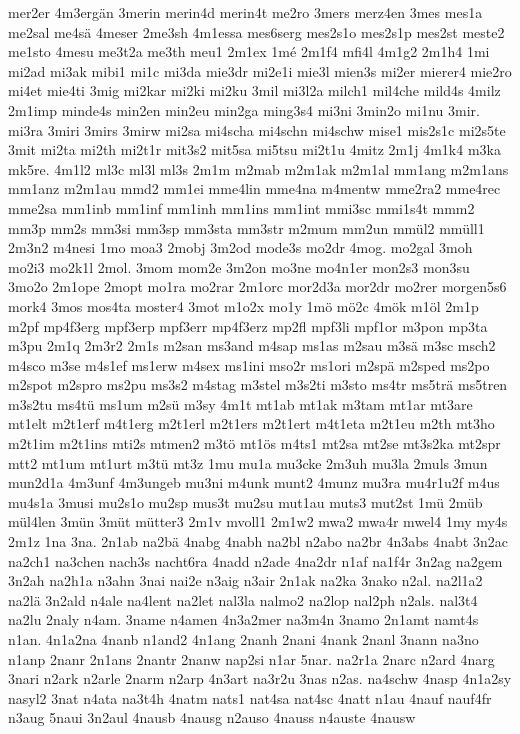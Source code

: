 {mer2er
4m3ergän
3merin
merin4d
merin4t
me2ro
3mers
merz4en
3mes
mes1a
me2sal
me4sä
4meser
2me3sh
4m1essa
mes6serg
mes2s1o
mes2s1p
mes2st
meste2
me1sto
4mesu
me3t2a
me3th
meu1
2m1ex
1mé
2m1f4
mfi4l
4m1g2
2m1h4
1mi
mi2ad
mi3ak
mibi1
mi1c
mi3da
mie3dr
mi2e1i
mie3l
mien3s
mi2er
mierer4
mie2ro
mi4et
mie4ti
3mig
mi2kar
mi2ki
mi2ku
3mil
mi3l2a
milch1
mil4che
mild4s
4milz
2m1imp
minde4s
min2en
min2eu
min2ga
ming3s4
mi3ni
3min2o
mi1nu
3mir.
mi3ra
3miri
3mirs
3mirw
mi2sa
mi4scha
mi4schn
mi4schw
mise1
mis2s1c
mi2s5te
3mit
mi2ta
mi2th
mi2t1r
mit3s2
mit5sa
mi5tsu
mi2t1u
4mitz
2m1j
4m1k4
m3ka
mk5re.
4m1l2
ml3c
ml3l
ml3s
2m1m
m2mab
m2m1ak
m2m1al
mm1ang
m2m1ans
mm1anz
m2m1au
mmd2
mm1ei
mme4lin
mme4na
m4mentw
mme2ra2
mme4rec
mme2sa
mm1inb
mm1inf
mm1inh
mm1ins
mm1int
mmi3sc
mmi1s4t
mmm2
mm3p
mm2s
mm3si
mm3sp
mm3sta
mm3str
m2mum
mm2un
mmül2
mmüll1
2m3n2
m4nesi
1mo
moa3
2mobj
3m2od
mode3s
mo2dr
4mog.
mo2gal
3moh
mo2i3
mo2k1l
2mol.
3mom
mom2e
3m2on
mo3ne
mo4n1er
mon2s3
mon3su
3mo2o
2m1ope
2mopt
mo1ra
mo2rar
2m1orc
mor2d3a
mor2dr
mo2rer
morgen5s6
mork4
3mos
mos4ta
moster4
3mot
m1o2x
mo1y
1mö
mö2c
4mök
m1öl
2m1p
m2pf
mp4f3erg
mpf3erp
mpf3err
mp4f3erz
mp2fl
mpf3li
mpf1or
m3pon
mp3ta
m3pu
2m1q
2m3r2
2m1s
m2san
ms3and
m4sap
ms1as
m2sau
m3sä
m3sc
msch2
m4sco
m3se
m4s1ef
ms1erw
m4sex
ms1ini
mso2r
ms1ori
m2spä
m2sped
ms2po
m2spot
m2spro
ms2pu
ms3s2
m4stag
m3stel
m3s2ti
m3sto
ms4tr
ms5trä
ms5tren
m3s2tu
ms4tü
ms1um
m2sü
m3sy
4m1t
mt1ab
mt1ak
m3tam
mt1ar
mt3are
mt1elt
m2t1erf
m4t1erg
m2t1erl
m2t1ers
m2t1ert
m4t1eta
m2t1eu
m2th
mt3ho
m2t1im
m2t1ins
mti2s
mtmen2
m3tö
mt1ös
m4ts1
mt2sa
mt2se
mt3s2ka
mt2spr
mtt2
mt1um
mt1urt
m3tü
mt3z
1mu
mu1a
mu3cke
2m3uh
mu3la
2muls
3mun
mun2d1a
4m3unf
4m3ungeb
mu3ni
m4unk
munt2
4munz
mu3ra
mu4r1u2f
m4us
mu4s1a
3musi
mu2s1o
mu2sp
mus3t
mu2su
mut1au
muts3
mut2st
1mü
2müb
mül4len
3mün
3müt
mütter3
2m1v
mvoll1
2m1w2
mwa2
mwa4r
mwel4
1my
my4s
2m1z
1na
3na.
2n1ab
na2bä
4nabg
4nabh
na2bl
n2abo
na2br
4n3abs
4nabt
3n2ac
na2ch1
na3chen
nach3s
nacht6ra
4nadd
n2ade
4na2dr
n1af
na1f4r
3n2ag
na2gem
3n2ah
na2h1a
n3ahn
3nai
nai2e
n3aig
n3air
2n1ak
na2ka
3nako
n2al.
na2l1a2
na2lä
3n2ald
n4ale
na4lent
na2let
nal3la
nalmo2
na2lop
nal2ph
n2als.
nal3t4
na2lu
2naly
n4am.
3name
n4amen
4n3a2mer
na3m4n
3namo
2n1amt
namt4s
n1an.
4n1a2na
4nanb
n1and2
4n1ang
2nanh
2nani
4nank
2nanl
3nann
na3no
n1anp
2nanr
2n1ans
2nantr
2nanw
nap2si
n1ar
5nar.
na2r1a
2narc
n2ard
4narg
3nari
n2ark
n2arle
2narm
n2arp
4n3art
na3r2u
3nas
n2as.
na4schw
4nasp
4n1a2sy
nasyl2
3nat
n4ata
na3t4h
4natm
nats1
nat4sa
nat4sc
4natt
n1au
4nauf
nauf4fr
n3aug
5naui
3n2aul
4nausb
4nausg
n2auso
4nauss
n4auste
4nausw
}
